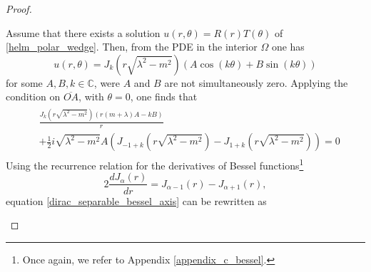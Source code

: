 \begin{proof}
\begin{enumerate}
    Assume that there exists a solution \(u(r, \theta) = R(r) T (\theta)\) of \eqref{helm_polar_wedge}. Then, from the \ac{PDE} in the interior \(\Omega\) one has
    \[
        u(r, \theta) = J_{k}\left(r \sqrt{\lambda^2-m^2}\right)\left(A \cos(k \theta)+B \sin(k \theta)\right)
    \]
    for some \(A, B, k \in \mathbb{C}\), were \(A\) and \(B\) are not simultaneously zero. Applying the condition on \(\overline{OA}\), with \(\theta=0\), one finds that
    \begin{align}\label{dirac_separable_bessel_axis}
        \begin{split}
            &\frac{J_{k}\left(r \sqrt{\lambda^2-m^2}\right)\left(r(m+\lambda)A-k B\right)}{r}\\
            &+ \frac{1}{2}i \sqrt{\lambda^2-m^2}A\left(J_{-1+k}\left(r \sqrt{\lambda^2-m^2}\right)-J_{1+k}\left(r \sqrt{\lambda^2-m^2}\right)\right)= 0
        \end{split}
    \end{align}
    Using the recurrence relation for the derivatives of Bessel functions\footnote{Once again, we refer to Appendix \ref{appendix_c_bessel}.}
    \[
        2 \frac{d J_\alpha (r)}{d r} = J_{\alpha-1} (r) - J_{\alpha+1} (r),
    \]
    equation \eqref{dirac_separable_bessel_axis} can be rewritten as

\end{enumerate}
\end{proof}
